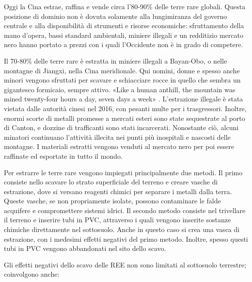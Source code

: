 \documentclass[12pt,a4paper,oneside]{book}
\begin{document}
Oggi la Cina estrae, raffina e vende circa l'80-90\% delle terre rare globali. Questa posizione di dominio non è dovuta solamente alla lungimiranza del governo centrale e alla disponibilità di strumenti e risorse economiche: sfruttamento della mano d'opera, bassi standard ambientali, miniere illegali e un redditizio mercato nero hanno portato a prezzi con i quali l'Occidente non è in grado di competere.

Il 70-80\% delle terre rare è estratta in miniere illegali a Bayan-Obo, o nelle montagne di Jiangxi, nella Cina meridionale. Qui uomini, donne e spesso anche minori vengono sfruttati per scavare e schiacciare rocce in quello che sembra un gigantesco formicaio, sempre attivo. «Like a human anthill, the mountain was mined twenty-four hours a day, seven days a week» \citep[p. 24]{pitron2020rare}.
L'estrazione illegale è stata vietata dalle autorità cinesi nel 2016, con pesanti multe per i trasgressori. Inoltre, enormi scorte di metalli promesse a mercati esteri sono state sequestrate al porto di Canton, e dozzine di trafficanti sono stati incarcerati.
Nonostante ciò, alcuni minatori continuano l'attività illecita nei punti più inospitali e nascosti delle montagne. I materiali estratti vengono venduti al mercato nero per poi essere raffinate ed esportate in tutto il mondo.

Per estrarre le terre rare vengono impiegati principalmente due metodi. Il primo consiste nello scavare lo strato superficiale del terreno e creare vasche di estrazione, dove si versano reagenti chimici per separare i metalli dalla terra. Queste vasche, se non propriamente isolate, possono contaminare le falde acquifere e compromettere sistemi idrici.
Il secondo metodo consiste nel trivellare il terreno e inserire tubi in PVC, attraverso i quali vengono inserite sostanze chimiche direttamente nel sottosuolo. Anche in questo caso si crea una vasca di estrazione, con i medesimi effetti negativi del primo metodo. Inoltre, spesso questi tubi in PVC vengono abbandonati nel sito dello scavo.

Gli effetti negativi dello scavo delle REE non sono limitati al sottosuolo terrestre; coinvolgono anche:
\end{document}

